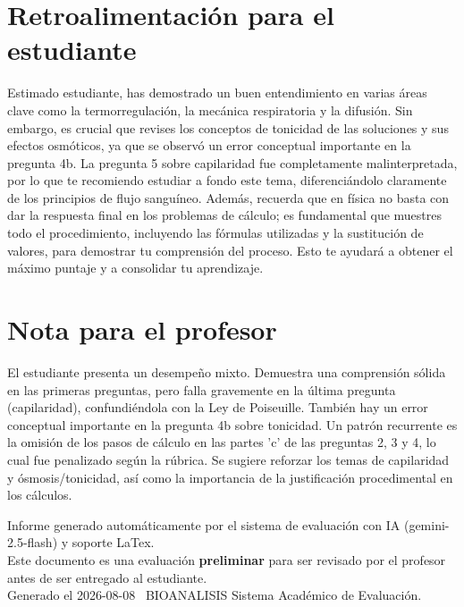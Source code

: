 \documentclass[11pt,a4paper]{article}
\begin{document}
\section*{Retroalimentación para el estudiante}
\begin{tcolorbox}[cajaRecomendacion, title={Dirigido a: Barbara Rodriguez}]
Estimado estudiante, has demostrado un buen entendimiento en varias áreas clave como la termorregulación, la mecánica respiratoria y la difusión. Sin embargo, es crucial que revises los conceptos de tonicidad de las soluciones y sus efectos osmóticos, ya que se observó un error conceptual importante en la pregunta 4b. La pregunta 5 sobre capilaridad fue completamente malinterpretada, por lo que te recomiendo estudiar a fondo este tema, diferenciándolo claramente de los principios de flujo sanguíneo. Además, recuerda que en física no basta con dar la respuesta final en los problemas de cálculo; es fundamental que muestres todo el procedimiento, incluyendo las fórmulas utilizadas y la sustitución de valores, para demostrar tu comprensión del proceso. Esto te ayudará a obtener el máximo puntaje y a consolidar tu aprendizaje.
\end{tcolorbox}

\section*{Nota para el profesor}
\begin{tcolorbox}[
  enhanced, breakable,
  colback=yellow!8, colframe=yellow!60!black,
  fonttitle=\bfseries, coltitle=black,
  title={Observaciones para revisión manual},
  top=4pt, bottom=4pt, left=8pt, right=8pt,
]
El estudiante presenta un desempeño mixto. Demuestra una comprensión sólida en las primeras preguntas, pero falla gravemente en la última pregunta (capilaridad), confundiéndola con la Ley de Poiseuille. También hay un error conceptual importante en la pregunta 4b sobre tonicidad. Un patrón recurrente es la omisión de los pasos de cálculo en las partes 'c' de las preguntas 2, 3 y 4, lo cual fue penalizado según la rúbrica. Se sugiere reforzar los temas de capilaridad y ósmosis/tonicidad, así como la importancia de la justificación procedimental en los cálculos.
\end{tcolorbox}

\vspace{12pt}
\begin{center}
  \footnotesize\color{gray}
  Informe generado automáticamente por el sistema de evaluación con IA (gemini-2.5-flash) y soporte LaTex. \\
  Este documento es una evaluación \textbf{preliminar} para ser revisado por el profesor antes de ser entregado al 
  estudiante. \\
  Generado el 2026-08-08 \textbullet\ BIOANALISIS Sistema Académico de Evaluación.
  \end{center}
\end{document}
